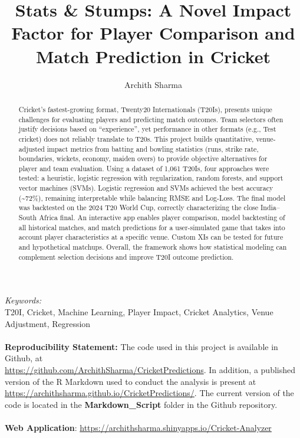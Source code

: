 \documentclass{article}[12pt]
\title{Stats \& Stumps: A Novel Impact Factor for Player Comparison and Match Prediction in Cricket}
\author[1]{Archith Sharma}
\date{}
\affil[1]{Carnegie Mellon University}
\begin{document}
\maketitle
\begin{abstract}
Cricket’s fastest-growing format, Twenty20 Internationals (T20Is), presents unique challenges for evaluating players and predicting match outcomes. Team selectors often justify decisions based on “experience”, yet performance in other formats (e.g., Test cricket) does not reliably translate to T20s. This project builds quantitative, venue-adjusted impact metrics from batting and bowling statistics (runs, strike rate, boundaries, wickets, economy, maiden overs) to provide objective alternatives for player and team evaluation. Using a dataset of 1,061 T20Is, four approaches were tested: a heuristic, logistic regression with regularization, random forests, and support vector machines (SVMs). Logistic regression and SVMs achieved the best accuracy (\textasciitilde72\%), remaining interpretable while balancing RMSE and Log-Loss. The final model was backtested on the 2024 T20 World Cup, correctly characterizing the close India–South Africa final. An interactive app enables player comparison, model backtesting of all historical matches, and match predictions for a user-simulated game that takes into account player characteristics at a specific venue. Custom XIs can be tested for future and hypothetical matchups. Overall, the framework shows how statistical modeling can complement selection decisions and improve T20I outcome prediction.
\end{abstract}
\textit{Keywords:} \\
T20I, Cricket, Machine Learning, Player Impact, Cricket Analytics, Venue Adjustment, Regression
\\
\\\label{reproducibility}\textbf{Reproducibility Statement:} The code used in this project is available in Github, at \\ \href{https://github.com/ArchithSharma/CricketPredictions}{https://github.com/ArchithSharma/CricketPredictions}. In addition, a published version of the R Markdown used to conduct the analysis is present at \href{https://archithsharma.github.io/CricketPredictions/}{https://archithsharma.github.io/CricketPredictions/}. The current version of the code is located in the \textbf{Markdown\_Script} folder in the Github repository.
\\
\\
\textbf{Web Application}: \href{https://archithsharma.shinyapps.io/Cricket-Analyzer}{https://archithsharma.shinyapps.io/Cricket-Analyzer}
\end{document}
